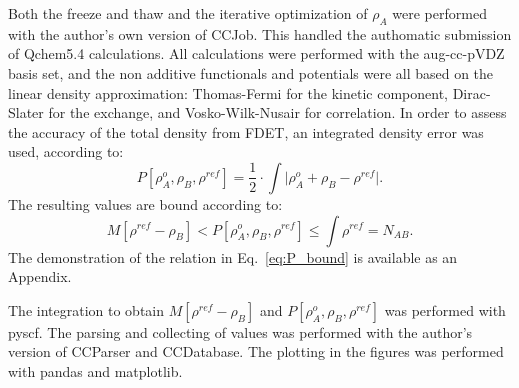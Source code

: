 \documentclass[journal=jctcce,manuscript=article, layout=twocolumn]{achemso}
\begin{document}
Both the freeze and thaw and the iterative optimization of $\rho_A$ were performed with the author's own version\cite{CCJob_Ricardi} of CCJob\cite{CCJob_Zech}. This handled the authomatic submission of Qchem5.4\cite{Qchem54} calculations. 
All calculations were performed with the aug-cc-pVDZ basis set, and the non additive functionals and potentials were all based on the linear density approximation: Thomas-Fermi\cite{Thomas1927, Fermi1928} for the kinetic component, Dirac-Slater\cite{Slater1929} for the exchange, and Vosko-Wilk-Nusair\cite{Vosko1980} for correlation.
In order to assess the accuracy of the total density from FDET, an integrated density error was used, according to:
\begin{equation}
 P[\rho^{o}_A, \rho_B, \rho^{ref}] = \frac{1}{2} \cdot \int \vert \rho^{o}_A + \rho_B - \rho^{ref} \vert .
\end{equation}
The resulting values are bound according to:
\begin{equation} \label{eq:P_bound}
 M[\rho^{ref} - \rho_B] < P[\rho^{o}_A, \rho_B, \rho^{ref}] \leq \int \rho^{ref} = N_{AB}.
\end{equation}
The demonstration of the relation in Eq.~\ref{eq:P_bound} is available as an Appendix.

The integration to obtain $M[\rho^{ref} - \rho_B]$ and $P[\rho^{o}_A, \rho_B, \rho^{ref}]$ was performed with  pyscf\cite{PYSCF}.
The parsing and collecting of values was performed with the author's version\cite{CCParser_Ricardi} of CCParser\cite{CCParser_Zech} and CCDatabase\cite{CCDatabase}. The plotting in the figures was performed with pandas\cite{PANDAS} and matplotlib\cite{Hunter2007}.
\end{document}
